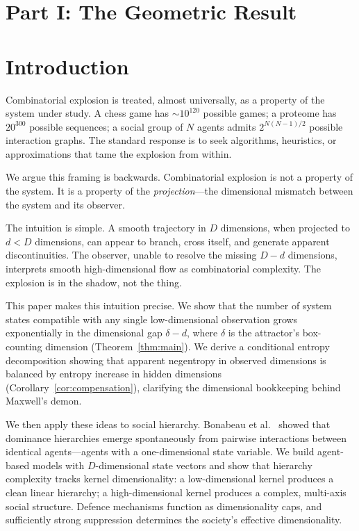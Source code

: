 \documentclass[12pt,a4paper]{article}
\begin{document}
\section*{Part I: The Geometric Result}

\section{Introduction}

Combinatorial explosion is treated, almost universally, as a property of the system under study.
A chess game has $\sim 10^{120}$ possible games; a proteome has $20^{300}$ possible sequences; a social group of $N$ agents admits $2^{N(N-1)/2}$ possible interaction graphs.
The standard response is to seek algorithms, heuristics, or approximations that tame the explosion from within.

We argue this framing is backwards.
Combinatorial explosion is not a property of the system.
It is a property of the \emph{projection}---the dimensional mismatch between the system and its observer.

The intuition is simple.
A smooth trajectory in $D$ dimensions, when projected to $d < D$ dimensions, can appear to branch, cross itself, and generate apparent discontinuities.
The observer, unable to resolve the missing $D - d$ dimensions, interprets smooth high-dimensional flow as combinatorial complexity.
The explosion is in the shadow, not the thing.

This paper makes this intuition precise.
We show that the number of system states compatible with any single low-dimensional observation grows exponentially in the dimensional gap $\delta - d$, where $\delta$ is the attractor's box-counting dimension (Theorem~\ref{thm:main}).
We derive a conditional entropy decomposition showing that apparent negentropy in observed dimensions is balanced by entropy increase in hidden dimensions (Corollary~\ref{cor:compensation}), clarifying the dimensional bookkeeping behind Maxwell's demon.

We then apply these ideas to social hierarchy.
Bonabeau et al.~\citeyearpar{bonabeau1996} showed that dominance hierarchies emerge spontaneously from pairwise interactions between identical agents---agents with a one-dimensional state variable.
We build agent-based models with $D$-dimensional state vectors and show that hierarchy complexity tracks kernel dimensionality: a low-dimensional kernel produces a clean linear hierarchy; a high-dimensional kernel produces a complex, multi-axis social structure.
Defence mechanisms function as dimensionality caps, and sufficiently strong suppression determines the society's effective dimensionality.
\end{document}
